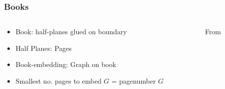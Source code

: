 \documentclass[english]{beamer}
\begin{document}
\begin{frame}
  \frametitle{Books}
  \begin{columns}
    \begin{column}{0.5\textwidth}
      \begin{itemize}
        \item Book: half-planes glued on boundary
        \item Half Planes: Pages
        \item Book-embedding: Graph on book
        \item Smallest no. pages to embed $G$ = pagenumber $G$
      \end{itemize}
    \end{column}
    \begin{column}{0.5\textwidth}
      \begin{figure}
        \centering
        
        \caption{From \cite{eppsteinBookEmbedding2014}}
      \end{figure}
    \end{column}
  \end{columns}
\end{frame}
\end{document}
